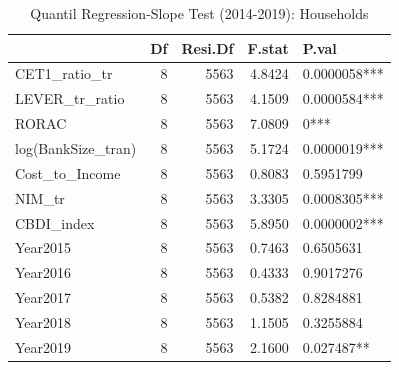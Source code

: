 \begin{table}[ht]
\centering
\caption{Quantil Regression-Slope Test (2014-2019): Households} 
\begingroup\small
\begin{tabular}{lrrrl}
  \toprule
 & Df & Resi.Df & F.stat & P.val \\ 
  \midrule
CET1\_ratio\_tr & 8 & 5563 & 4.8424 & 0.0000058*** \\ 
  LEVER\_tr\_ratio & 8 & 5563 & 4.1509 & 0.0000584*** \\ 
  RORAC & 8 & 5563 & 7.0809 & 0*** \\ 
  log(BankSize\_tran) & 8 & 5563 & 5.1724 & 0.0000019*** \\ 
  Cost\_to\_Income & 8 & 5563 & 0.8083 & 0.5951799 \\ 
  NIM\_tr & 8 & 5563 & 3.3305 & 0.0008305*** \\ 
  CBDI\_index & 8 & 5563 & 5.8950 & 0.0000002*** \\ 
  Year2015 & 8 & 5563 & 0.7463 & 0.6505631 \\ 
  Year2016 & 8 & 5563 & 0.4333 & 0.9017276 \\ 
  Year2017 & 8 & 5563 & 0.5382 & 0.8284881 \\ 
  Year2018 & 8 & 5563 & 1.1505 & 0.3255884 \\ 
  Year2019 & 8 & 5563 & 2.1600 & 0.027487** \\ 
   \bottomrule
\end{tabular}
\endgroup
\end{table}

